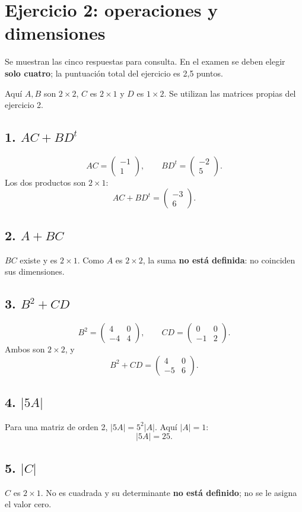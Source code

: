 \documentclass[11pt]{article}
\begin{document}
\section*{Ejercicio 2: operaciones y dimensiones}
Se muestran las cinco respuestas para consulta. En el examen se deben elegir \textbf{solo cuatro}; la puntuación total del ejercicio es 2,5 puntos.

Aquí $A,B$ son $2\times2$, $C$ es $2\times1$ y $D$ es $1\times2$. Se utilizan las matrices propias del ejercicio 2.
\subsection*{1. $AC+BD^t$}
\[
AC=\begin{pmatrix}-1\\1\end{pmatrix},\qquad
BD^t=\begin{pmatrix}-2\\5\end{pmatrix}.
\]
Los dos productos son $2\times1$:
\[\boxed{AC+BD^t=\begin{pmatrix}-3\\6\end{pmatrix}}.\]
\subsection*{2. $A+BC$}
$BC$ existe y es $2\times1$. Como $A$ es $2\times2$, la suma \textbf{no está definida}: no coinciden sus dimensiones.
\subsection*{3. $B^2+CD$}
\[
B^2=\begin{pmatrix}4&0\\-4&4\end{pmatrix},\qquad
CD=\begin{pmatrix}0&0\\-1&2\end{pmatrix}.
\]
Ambos son $2\times2$, y
\[\boxed{B^2+CD=\begin{pmatrix}4&0\\-5&6\end{pmatrix}}.\]
\subsection*{4. $|5A|$}
Para una matriz de orden 2, $|5A|=5^2|A|$. Aquí $|A|=1$:
\[\boxed{|5A|=25}.\]
\subsection*{5. $|C|$}
$C$ es $2\times1$. No es cuadrada y su determinante \textbf{no está definido}; no se le asigna el valor cero.
\clearpage
\end{document}
